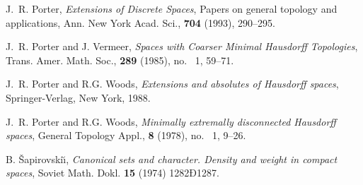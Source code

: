 \documentclass[11pt]{amsart}
\theoremstyle{definition}
\theoremstyle{remark}
\numberwithin{equation}{section}
\begin{document}
\begin{thebibliography}{21}
J.~R. Porter, \emph{Extensions of Discrete Spaces}, Papers on general topology and applications, Ann. New York Acad. Sci., \textbf{704} (1993), 290--295.

J.~R. Porter and J. Vermeer, \emph{Spaces with Coarser Minimal Hausdorff Topologies}, Trans. Amer. Math. Soc., \textbf{289} (1985), no.~ 1, 59--71.
  
J.~R. Porter and R.G. Woods, \emph{Extensions and absolutes of Hausdorff spaces}, Springer-Verlag, New York, 1988.

J.~R. Porter and R.G. Woods, \emph{Minimally extremally disconnected Hausdorff spaces}, General Topology Appl., \textbf{8} (1978), no.~ 1, 9--26.
  
 
B. {{\v{S}}apirovski{\u\i}}, \emph{Canonical sets and character. Density and weight in compact spaces}, Soviet Math. Dokl. \textbf{15} (1974) 1282Ð1287.

\end{thebibliography}
\end{document}
